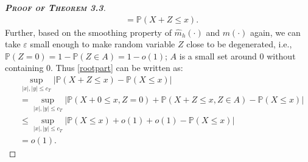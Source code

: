 \documentclass[a4paper]{article}
\begin{document}
\begin{proof}[\textbf{\textsc{Proof of Theorem 3.3}}]
\begin{equation}
\begin{split}
    & = \mathbb{P}\left( X + Z \leq x    \right).
\end{split}
\end{equation}
Further, based on the smoothing property of $\widehat{m}_h(\cdot)$ and $m(\cdot)$ again, we can take $\varepsilon$ small enough to make random variable $Z$ close to be degenerated, i.e., $\mathbb{P}(Z = 0) = 1 -\mathbb{P}(Z\in A) = 1 - o(1)$; $A$ is a small set around 0 without containing 0. Thus \cref{rootpart} can be written as:
\begin{equation}
\begin{split}
    &\sup_{|x|, |y| \leq c_{T}}\left| \mathbb{P}\left( X + Z \leq x    \right) - \mathbb{P}(X\leq x)      \right| \\
    &= \sup_{|x|, |y| \leq c_{T}}\left| \mathbb{P}(X + 0 \leq x, Z = 0) + \mathbb{P}(X + Z \leq x, Z \in A) -   \mathbb{P}(X\leq x)   \right|\\
    & \leq \sup_{|x|, |y| \leq c_{T}}\left| \mathbb{P}(X\leq x) + o(1) + o(1) -   \mathbb{P}(X\leq x)   \right|\\
    & = o(1).
\end{split}
\end{equation}


\end{proof}
\end{document}
